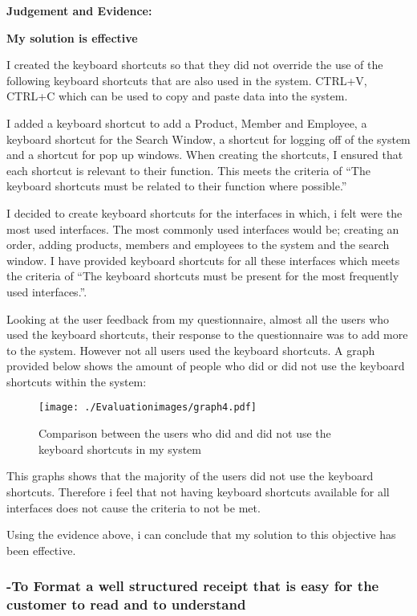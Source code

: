 \textbf{Judgement and Evidence:} \newline

\textbf{\large{My solution is effective}}

I created the keyboard shortcuts so that they did not override the use of the following keyboard shortcuts that are also used in the system. CTRL+V, CTRL+C which can be used to copy and paste data into the system. 

I added a keyboard shortcut to add a Product, Member and Employee, a keyboard shortcut for the Search Window, a shortcut for logging off of the system and a shortcut for pop up windows. When creating the shortcuts, I ensured that each shortcut is relevant to their function. This meets the criteria of ``The keyboard shortcuts must be related to their function where possible.''

I decided to create keyboard shortcuts for the interfaces in which, i felt were the most used interfaces. The most commonly used interfaces would be; creating an order, adding products, members and employees to the system and the search window. I have provided keyboard shortcuts for all these interfaces which meets the criteria of ``The keyboard shortcuts must be present for the most frequently used interfaces.''.

Looking at the user feedback from my questionnaire, almost all the users who used the keyboard shortcuts, their response to the questionnaire was to add more to the system. However not all users used the keyboard shortcuts. A graph provided below shows the amount of people who did or did not use the keyboard shortcuts within the system:

\begin{figure}[H]
\caption{Comparison between the users who did and did not use the keyboard shortcuts in my system} \label{graph4}
\hfill\texttt{[image: ./Evaluationimages/graph4.pdf]}
\end{figure}

This graphs shows that the majority of the users did not use the keyboard shortcuts. Therefore i feel that not having keyboard shortcuts available for all interfaces does not cause the criteria to not be met.

Using the evidence above, i can conclude that my solution to this objective has been effective.





\pagebreak
\subsubsection{-To Format a well structured receipt that is easy for the customer to read and to understand}

